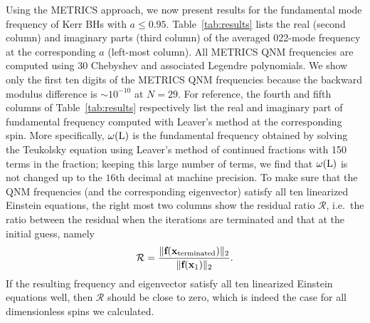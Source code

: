 \documentclass[aps,prx,amsmath,floats,floatfix,twocolumn,
  superscriptaddress,nofootinbib,showpacs]{revtex4-1}
\begin{document}
Using the METRICS approach, we now present results for the fundamental mode frequency of Kerr BHs with $a \leq 0.95$. 
Table~\ref{tab:results} lists the real (second column) and imaginary parts (third column) of the averaged 022-mode frequency at the corresponding $a$ (left-most column). 
All METRICS QNM frequencies are computed using 30 Chebyshev and associated Legendre polynomials. 
We show only the first ten digits of the METRICS QNM frequencies because the backward modulus difference is $\sim 10^{-10}$ at $N=29$. 
For reference, the fourth and fifth columns of Table~\ref{tab:results} respectively list the real and imaginary part of fundamental frequency computed with Leaver's method at the corresponding spin. 
More specifically, $\omega(\rm L)$ is the fundamental frequency obtained by solving the Teukolsky equation using Leaver's method of continued fractions with 150 terms in the fraction; keeping this large number of terms, we find that $\omega(\rm L)$ is not changed up to the $16\textrm{th}$ decimal at machine precision.
To make sure that the QNM frequencies (and the corresponding eigenvector) satisfy all ten linearized Einstein equations, the right most two columns show the residual ratio $\mathcal{R}$, i.e.~the ratio between the residual when the iterations are terminated and that at the initial guess, namely 
\begin{equation}\label{eq:residual_ratio}
\mathcal{R} = \frac{\| \textbf{f}(\textbf{x}_{\rm terminated}) \|_{2} }{\| \textbf{f}(\textbf{x}_{1}) \|_{2} }. 
\end{equation}
If the resulting frequency and eigenvector satisfy all ten linearized Einstein equations well, then $\mathcal{R}$ should be close to zero, which is indeed the case for all dimensionless spins we calculated. 
\end{document}
